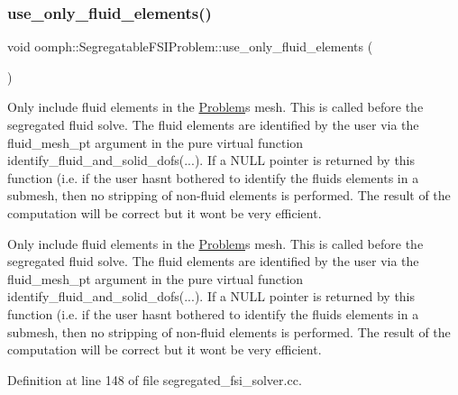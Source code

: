 \mbox{\label{classoomph_1_1SegregatableFSIProblem_a13a9841e0aa05bf57ec228b49b311a26}} 
\subsubsection{\texorpdfstring{use\+\_\+only\+\_\+fluid\+\_\+elements()}{use\_only\_fluid\_elements()}}
{\footnotesize\ttfamily void oomph\+::\+Segregatable\+F\+S\+I\+Problem\+::use\+\_\+only\+\_\+fluid\+\_\+elements (\begin{DoxyParamCaption}{ }\end{DoxyParamCaption})\hspace{0.3cm}{\ttfamily [private]}}



Only include fluid elements in the \hyperlink{classoomph_1_1Problem}{Problem}\textquotesingle{}s mesh. This is called before the segregated fluid solve. The fluid elements are identified by the user via the fluid\+\_\+mesh\+\_\+pt argument in the pure virtual function identify\+\_\+fluid\+\_\+and\+\_\+solid\+\_\+dofs(...). If a N\+U\+LL pointer is returned by this function (i.\+e. if the user hasn\textquotesingle{}t bothered to identify the fluids elements in a submesh, then no stripping of non-\/fluid elements is performed. The result of the computation will be correct but it won\textquotesingle{}t be very efficient. 

Only include fluid elements in the \hyperlink{classoomph_1_1Problem}{Problem}\textquotesingle{}s mesh. This is called before the segregated fluid solve. The fluid elements are identified by the user via the fluid\+\_\+mesh\+\_\+pt argument in the pure virtual function identify\+\_\+fluid\+\_\+and\+\_\+solid\+\_\+dofs(...). If a N\+U\+LL pointer is returned by this function (i.\+e. if the user hasn\textquotesingle{}t bothered to identify the fluids elements in a submesh, then no stripping of non-\/fluid elements is performed. The result of the computation will be correct but it won\textquotesingle{}t be very efficient. 

Definition at line 148 of file segregated\+\_\+fsi\+\_\+solver.\+cc.



